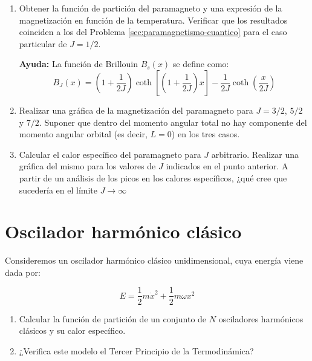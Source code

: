 \documentclass[a4paper,11pt]{article}
\begin{document}
\begin{enumerate}[label=(\alph*),
                  leftmargin=2\parindent,
                  rightmargin=2\parindent]

    \item{Obtener la función de partición del paramagneto y una 
          expresión de la magnetización en función de la temperatura. 
          Verificar que los resultados coinciden a los del Problema 
          \ref{sec:paramagnetismo-cuantico} para el caso particular de 
          $J=1/2$.}
    
    {\small
    \textbf{Ayuda:} La función de Brillouin $B_s(x)$ se define como:
    $$ B_J(x)  = \left( 1 + \frac{1}{2J} \right)
    \coth \left[ \left( 1 + \frac{1}{2J} \right)x \right] -
    \frac{1}{2J} \coth \left( \frac{x}{2J} \right) $$
    }

    \item{Realizar una gráfica de la magnetización del paramagneto 
          para $J = 3/2$, $5/2$ y $7/2$. Suponer que dentro del momento 
          angular total no hay componente del momento angular orbital 
          (es decir, $L=0$) en los tres casos.}
    
    \item{Calcular el calor específico del paramagneto para $J$ 
          arbitrario. Realizar una gráfica del mismo para los valores de $J$ 
          indicados en el punto anterior.
          A partir de un análisis de los picos en los calores 
          específicos, ¿qué cree que sucedería en el límite
          $J \rightarrow \infty$}

\end{enumerate}



\section{Oscilador harmónico clásico}

Consideremos un oscilador harmónico clásico unidimensional, cuya 
energía viene dada por:

$$ E = \frac{1}{2} m \dot{x}^2 + \frac{1}{2} m \omega x^2 $$


\begin{enumerate}[label=(\alph*),
                  leftmargin=2\parindent,
                  rightmargin=2\parindent]
                  
    \item{Calcular la función de partición de un conjunto de $N$ 
          osciladores harmónicos clásicos y su calor específico.}

    \item{¿Verifica este modelo el Tercer Principio de la 
          Termodinámica?}

\end{enumerate}
\end{document}
